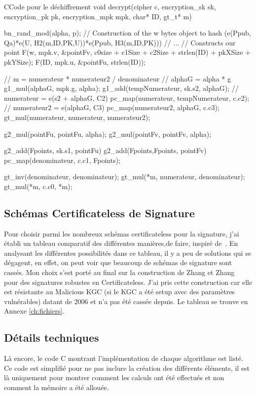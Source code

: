 \begin{sourcebox}{C}{Code pour le déchiffrement}
	void decrypt(cipher c, encryption_sk sk, encryption_pk pk, encryption_mpk  mpk, char* ID, gt_t* m){
		bn_rand_mod(alpha, p);
		// Construction of the w bytes object to hash (e(Ppub, Qa)*e(U, H2(m,ID,PK,U))*e(Ppub, H3(m,ID,PK)))
		// ...
		// Constructs our point
		F(w, mpk.v, &pointFv, c0size + c1Size + c2Size + strlen(ID) + pkXSize + pkYSize);
		F(ID, mpk.u, &pointFu, strlen(ID));
		
		// m = numerateur * numerateur2 / denominateur
		// alphaG = alpha * g
		g1_mul(alphaG, mpk.g, alpha);
		g1_add(tempNumerateur, sk.s2, alphaG);
		// numerateur = e(s2 + alphaG, C2)
		pc_map(numerateur, tempNumerateur, c.c2);
		// numerateur2 = e(alphaG, C3)
		pc_map(numerateur2, alphaG, c.c3);
		gt_mul(numerateur, numerateur, numerateur2);
		
		g2_mul(pointFu, pointFu, alpha);
		g2_mul(pointFv, pointFv, alpha);
		
		g2_add(Fpoints, sk.s1, pointFu)
		g2_add(Fpoints,Fpoints, pointFv)
		pc_map(denominateur, c.c1, Fpoints);
		
		gt_inv(denominateur, denominateur);
		gt_mul(*m, numerateur, denominateur);
		gt_mul(*m, c.c0, *m);
	}
\end{sourcebox}

\subsection{Schémas Certificateless de Signature}
Pour choisir parmi les nombreux schémas certificateless pour la signature, j'ai établi un tableau comparatif des différentes manières,de faire, inspiré de~\cite{bookIntroCertificateless}. En analysant les différentes possibilités dans ce tableau, il y a peu de solutions qui se dégagent, en effet, on peut voir que beaucoup de schémas de signature sont cassés. Mon choix s'est porté au final sur la construction de Zhang et Zhang~\cite{conf/acns/ZhangWXF06} pour des signatures robustes en Certificateless. J'ai pris cette construction car elle est résistante au Malicious KGC (si le KGC a été setup avec des paramètres vulnérables) datant de 2006 et n'a pas été cassée depuis. Le tableau se trouve en Annexe \ref{ch:fichiers}.
\subsection{Détails techniques}
Là encore, le code C montrant l'implémentation de chaque algorithme est listé. Ce code est simplifié pour ne pas inclure la création des différents éléments, il est là uniquement pour montrer comment les calculs ont été effectués et non comment la mémoire a été allouée.
 
